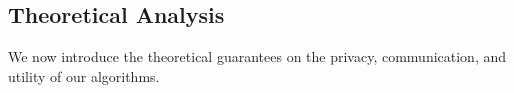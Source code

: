 
\subsection{Theoretical Analysis}
\label{sub:algorithms_theoretical_analysis}
We now introduce the theoretical guarantees on
the privacy, communication, and
utility of 
our algorithms. 

